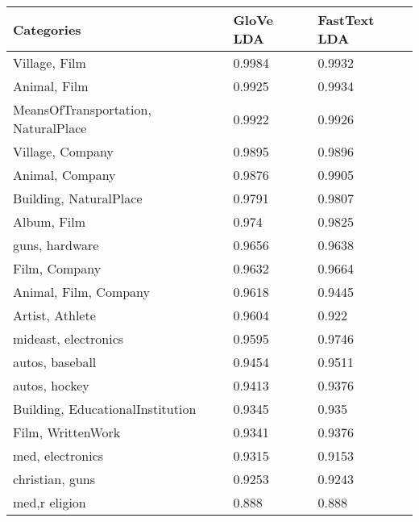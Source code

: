 \begin{table}[]
\centering
\captionsetup{position=bottom}
\begin{tabular}{lll}
\toprule
Categories                      & GloVe LDA       & FastText LDA \\
\midrule
Village, Film                               & 0.9984       & 0.9932                 \\
Animal, Film                                & 0.9925       & 0.9934                 \\
MeansOfTransportation, NaturalPlace          & 0.9922       & 0.9926                 \\
Village, Company                            & 0.9895       & 0.9896                 \\
Animal, Company                             & 0.9876       & 0.9905                 \\
Building, NaturalPlace                      & 0.9791       & 0.9807                 \\
Album, Film                                 & 0.974        & 0.9825                 \\
guns, hardware                              & 0.9656       & 0.9638                 \\
Film, Company                               & 0.9632       & 0.9664                 \\
Animal, Film, Company                        & 0.9618       & 0.9445                 \\
Artist, Athlete                             & 0.9604       & 0.922                  \\
mideast, electronics                        & 0.9595       & 0.9746                 \\
autos, baseball                             & 0.9454       & 0.9511                 \\
autos, hockey                               & 0.9413       & 0.9376                 \\
Building, EducationalInstitution            & 0.9345       & 0.935                  \\
Film, WrittenWork                           & 0.9341       & 0.9376                 \\
med, electronics                            & 0.9315       & 0.9153                 \\
christian, guns                             & 0.9253       & 0.9243                 \\
med,r eligion                               & 0.888        & 0.888                  \\

\end{tabular}
\end{table}
